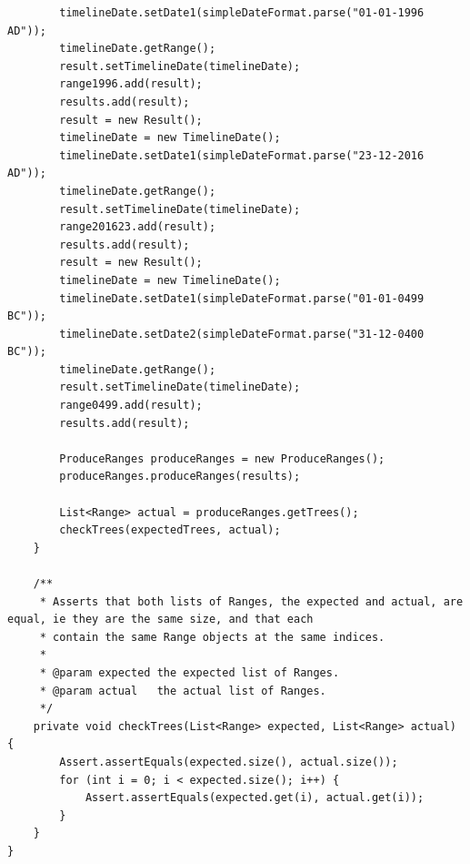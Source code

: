 \begin{lstlisting}
        timelineDate.setDate1(simpleDateFormat.parse("01-01-1996 AD"));
        timelineDate.getRange();
        result.setTimelineDate(timelineDate);
        range1996.add(result);
        results.add(result);
        result = new Result();
        timelineDate = new TimelineDate();
        timelineDate.setDate1(simpleDateFormat.parse("23-12-2016 AD"));
        timelineDate.getRange();
        result.setTimelineDate(timelineDate);
        range201623.add(result);
        results.add(result);
        result = new Result();
        timelineDate = new TimelineDate();
        timelineDate.setDate1(simpleDateFormat.parse("01-01-0499 BC"));
        timelineDate.setDate2(simpleDateFormat.parse("31-12-0400 BC"));
        timelineDate.getRange();
        result.setTimelineDate(timelineDate);
        range0499.add(result);
        results.add(result);

        ProduceRanges produceRanges = new ProduceRanges();
        produceRanges.produceRanges(results);

        List<Range> actual = produceRanges.getTrees();
        checkTrees(expectedTrees, actual);
    }

    /**
     * Asserts that both lists of Ranges, the expected and actual, are equal, ie they are the same size, and that each
     * contain the same Range objects at the same indices.
     *
     * @param expected the expected list of Ranges.
     * @param actual   the actual list of Ranges.
     */
    private void checkTrees(List<Range> expected, List<Range> actual) {
        Assert.assertEquals(expected.size(), actual.size());
        for (int i = 0; i < expected.size(); i++) {
            Assert.assertEquals(expected.get(i), actual.get(i));
        }
    }
}
\end{lstlisting}

